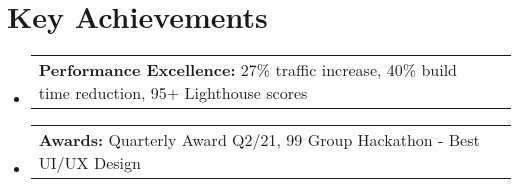 \documentclass[a4paper, 11pt]{article}
\makeatletter
\newcommand{\resumeProjectHeading}[2]{
    \item
    \begin{tabular*}{0.987\textwidth}{l@{\extracolsep{\fill}}r}
      \small#1\\
    \end{tabular*}\vspace{-7pt}
}
\newcommand{\resumeSubHeadingListStart}{\begin{itemize}[leftmargin=0.1in, label={}]}
\newcommand{\resumeSubHeadingListEnd}{\end{itemize}\vspace{5pt}}
\makeatother
\begin{document}
\section{Key Achievements}
    \resumeSubHeadingListStart
        \resumeProjectHeading
            {\textbf{Performance Excellence:} 27\% traffic increase, 40\% build time reduction, 95+ Lighthouse scores}{}
        \resumeProjectHeading
            {\textbf{Awards:} Quarterly Award Q2/21, 99 Group Hackathon - Best UI/UX Design}{}
    \resumeSubHeadingListEnd
\end{document}
